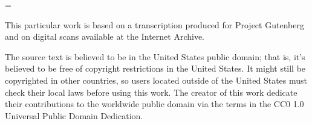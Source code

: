 
\vfil\break

\bgroup
\leavevmode\vfill
\parindent=0pt
\parskip=\baselineskip
\scalemain\typoscale[800/]

This particular work is based on a transcription produced for Project Gutenberg and on digital scans available at the Internet Archive.

The source text is believed to be in the United States public domain; that is, it’s believed to be free of copyright restrictions in the United States. It might still be copyrighted in other countries, so users located outside of the United States must check their local laws before using this work. The creator of this work dedicate their contributions to the worldwide public domain via the terms in the CC0 1.0 Universal Public Domain Dedication.
\egroup
